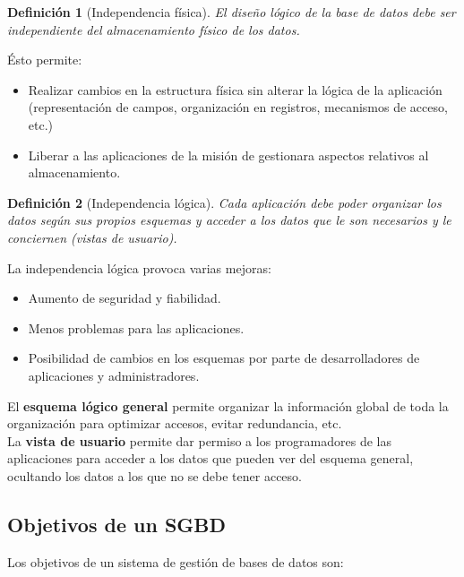 \documentclass[12pt,spanish]{article}
\newtheorem{definition}{Definición}
\numberwithin{definition}{subsection}
\begin{document}
\begin{definition}[Independencia física]
	El diseño lógico de la base de datos debe ser independiente del almacenamiento físico de los datos.
\end{definition}

Ésto permite:

\begin{itemize}
	\item Realizar cambios en la estructura física sin alterar la lógica de la aplicación (representación de campos, organización en registros, mecanismos de acceso, etc.)
	\item Liberar a las aplicaciones de la misión de gestionara aspectos relativos al almacenamiento.
\end{itemize}

\begin{definition}[Independencia lógica]
	Cada aplicación debe poder organizar los datos según sus propios esquemas y acceder a los datos que le son necesarios y le conciernen (vistas de usuario).
\end{definition}

La independencia lógica provoca varias mejoras:
\begin{itemize}
	\item Aumento de seguridad y fiabilidad.
	\item Menos problemas para las aplicaciones.
	\item Posibilidad de cambios en los esquemas por parte de desarrolladores de aplicaciones y administradores.
\end{itemize}

El \textbf{esquema lógico general} permite organizar la información global de toda la organización para optimizar accesos, evitar redundancia, etc.\\

La \textbf{vista de usuario} permite dar permiso a los programadores de las aplicaciones para acceder a los datos que pueden ver del esquema general, ocultando los datos a los que no se debe tener acceso.\\

\subsection{Objetivos de un SGBD}

Los objetivos de un sistema de gestión de bases de datos son:
\end{document}
